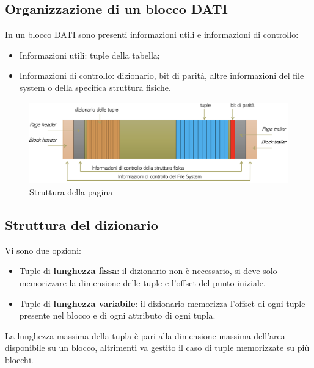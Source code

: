 \documentclass[oneside,a4paper,11pt]{book}
\theoremstyle{italicstyle}
\theoremstyle{normStyle}
\begin{document}
\subsection{Organizzazione di un blocco DATI}
In un blocco DATI sono presenti informazioni utili e informazioni di controllo:
\begin{itemize}
    \item Informazioni utili: tuple della tabella;
    \item Informazioni di controllo: dizionario, bit di parità, altre informazioni del 
    file system o della specifica struttura fisiche.
\end{itemize}
\begin{figure}[H]
    \centering
    \includegraphics[width=15cm]{img/Tabella_livello_fisico.png}
    \caption{Struttura della pagina}
    \label{fig:pagina_struttura}
\end{figure}
\subsection{Struttura del dizionario}
Vi sono due opzioni:
\begin{itemize}
    \item Tuple di \textbf{lunghezza fissa}: il dizionario non è necessario, 
    si deve solo memorizzare la dimensione delle tuple e l'offset del punto iniziale.
    \item Tuple di \textbf{lunghezza variabile}: il dizionario memorizza l'offset di ogni 
    tuple presente nel blocco e di ogni attributo di ogni tupla.
\end{itemize}
La lunghezza massima della tupla è pari alla dimensione massima dell'area disponibile su un blocco,
altrimenti va gestito il caso di tuple memorizzate su più blocchi.
\end{document}
